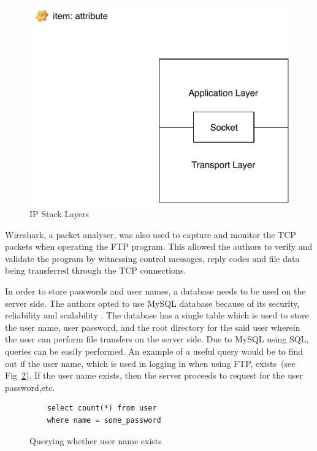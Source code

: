 \documentclass[journal, a4paper]{IEEEtran}
\begin{document}
\begin{figure}[hbtp!]
	\centering
	\includegraphics[scale = 1.2]{socket}
	\caption{IP Stack Layers}
	\label {socket}
\end{figure}


Wireshark, a packet analyser, was also used to capture and monitor the TCP packets when operating the FTP program. This allowed the authors to verify and validate the program by witnessing control messages, reply codes and file data being transferred through the TCP connections.

In order to store passwords and user names, a database needs to be used on the server side. The authors opted to use MySQL database because of its security, reliability and scalability \cite{mysql}. The database has a single table which is used to store the user name, user password, and the root directory for the said user wherein the user can perform file transfers on the server side. Due to MySQL using SQL, queries can be easily performed. An example of a useful query would be to find out if the user name, which is used in logging in when using FTP, exists~(see Fig~\ref{qu}). If the user name exists, then the server proceeds to request for the user password,etc.

\begin{figure}[hbtp]
	\begin{lstlisting}
	select count(*) from user 
	where name = some_password
	\end{lstlisting}
	\caption{Querying whether user name exists}
	\label {qu}
\end{figure}
\end{document}
